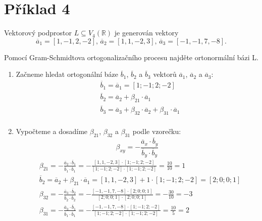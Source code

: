 \documentclass[12pt,a4paper]{article}
\newcommand{\pageline}{\noindent\makebox[\linewidth]{\rule{\linewidth}{0.4pt}}\vspace{5pt}}
\begin{document}

\newpage
\section*{Příklad 4}
Vektorový podprostor $L \subseteq V_4(\mathbb{R})$ je generován vektory
$$ \overline{a}_1 = [1, - 1, 2, - 2]\text{, }\overline{a}_2 = [1, 1, - 2, 3]\text{, }\overline{a}_3 = [- 1, - 1, 7, - 8]\text{.} $$

Pomocí Gram-Schmidtova ortogonalizačního procesu najděte ortonormální bázi L.

\pageline

\begin{enumerate}
    \item Začneme hledat ortogonální báze $\overline{b}_1$, $\overline{b}_2$ a $\overline{b}_3$ vektorů $\overline{a}_1$, $\overline{a}_2$ a $\overline{a}_3$:
    \begin{align*}
        &\overline{b}_1 = \overline{a}_1 = [1;-1;2;-2] \\
        &\overline{b}_2 = \overline{a}_2 + \beta_{21} \cdot \overline{a}_1 \\
        &\overline{b}_3 = \overline{a}_3 + \beta_{32} \cdot \overline{a}_2 + \beta_{31} \cdot \overline{a}_1 \\
    \end{align*}
\item Vypočteme a dosadíme $\beta_{21}$, $\beta_{32}$ a $\beta_{31}$ podle vzorečku:
$$ \beta_{xy} = - \frac{\overline{a}_x \cdot \overline{b}_y}{\overline{b}_y \cdot \overline{b}_y} $$
    \begin{align*}
        &\beta_{21} = - \frac{\overline{a}_2 \cdot \overline{b}_1}{\overline{b}_1 \cdot \overline{b}_1} = - \frac{[1, 1, -2, 3] \cdot [1;-1;2;-2]}{[1;-1;2;-2] \cdot [1;-1;2;-2]} = \frac{10}{10} = 1  \\
        &\overline{b}_2 = \overline{a}_2 + \beta_{21} \cdot \overline{a}_1 = [1, 1, - 2, 3] + 1 \cdot [1;-1;2;-2] = [2;0;0;1] \\
        &\beta_{32} = - \frac{\overline{a}_3 \cdot \overline{b}_2}{\overline{b}_2 \cdot \overline{b}_2} = - \frac{[- 1, - 1, 7, - 8] \cdot [2;0;0;1]}{[2;0;0;1] \cdot [2;0;0;1]} = - \frac{30}{10} = - 3  \\
        &\beta_{31} = - \frac{\overline{a}_3 \cdot \overline{b}_1}{\overline{b}_1 \cdot \overline{b}_1} = - \frac{[- 1, - 1, 7, - 8] \cdot [1;-1;2;-2]}{[1;-1;2;-2] \cdot [1;-1;2;-2]} = \frac{10}{5} = 2  \\

\end{align*}
\end{enumerate}
\end{document}
